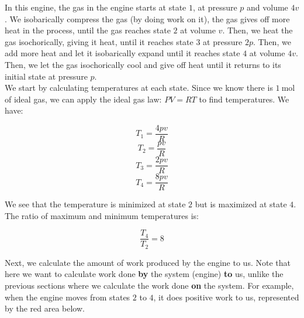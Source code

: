In this engine, the gas in the engine starts at state $1$, at pressure $p$ and volume $4v$. We isobarically compress the gas (by doing work on it), the gas gives off more heat in the process, until the gas reaches state $2$ at volume $v$. Then, we heat the gas isochorically, giving it heat, until it reaches state $3$ at pressure $2p$. Then, we add more heat and let it isobarically expand until it reaches state $4$ at volume $4v$. Then, we let the gas isochorically cool and give off heat until it returns to its initial state at pressure $p$. \\

We start by calculating temperatures at each state. Since we know there is $\SI{1}{\mole}$ of ideal gas, we can apply the ideal gas law: $PV=RT$ to find temperatures. We have:

\[T_1=\frac{4pv}{R}\]
\[T_2=\frac{pv}{R}\]
\[T_3=\frac{2pv}{R}\]
\[T_4=\frac{8pv}{R}\]

We see that the temperature is minimized at state $2$ but is maximized at state $4$. The ratio of maximum and minimum temperatures is:

\[\frac{T_4}{T_2}=8\]

Next, we calculate the amount of work produced by the engine to us. Note that here we want to calculate work done \textbf{by} the system (engine) \textbf{to} us, unlike the previous sections where we calculate the work done \textbf{on} the system. For example, when the engine moves from states $2$ to $4$, it does positive work to us, represented by the red area below.

\begin{center}
\end{center}

